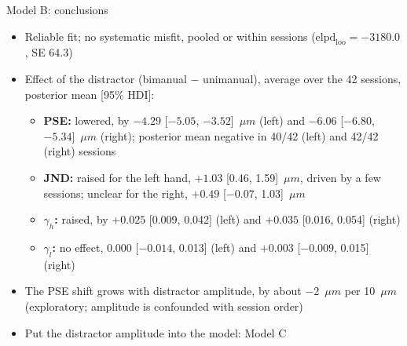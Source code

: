 \begin{frame}{Model B: conclusions}
  \small
  \begin{itemize}
    \item Reliable fit; no systematic misfit, pooled or within sessions
          ($\text{elpd}_\text{loo} = -3180.0$, SE 64.3)
    \item Effect of the distractor (bimanual $-$ unimanual), average over the 42 sessions,
          posterior mean [95\% HDI]:
    \begin{itemize}
      \item \textbf{PSE:} lowered, by $-4.29$ [$-5.05$, $-3.52$]~$\mu m$ (left) and
            $-6.06$ [$-6.80$, $-5.34$]~$\mu m$ (right); posterior mean negative in 40/42 (left) and
            42/42 (right) sessions
      \item \textbf{JND:} raised for the left hand, $+1.03$ [0.46, 1.59]~$\mu m$, driven by a
            few sessions; unclear for the right, $+0.49$ [$-0.07$, 1.03]~$\mu m$
      \item \textbf{\boldmath$\gamma_h$:} raised, by $+0.025$ [0.009, 0.042] (left) and
            $+0.035$ [0.016, 0.054] (right)
      \item \textbf{\boldmath$\gamma_l$:} no effect, $0.000$ [$-0.014$, 0.013] (left) and
            $+0.003$ [$-0.009$, 0.015] (right)
    \end{itemize}
    \item The PSE shift grows with distractor amplitude, by about $-2$~$\mu m$ per 10~$\mu m$
          (exploratory; amplitude is confounded with session order)
    \item[$\Rightarrow$] Put the distractor amplitude into the model: Model C
  \end{itemize}
\end{frame}
